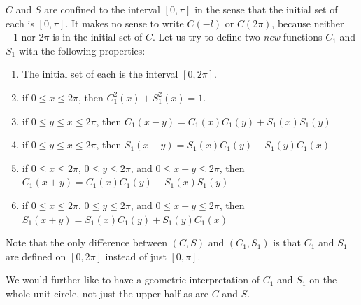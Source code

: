 \documentclass[english]{book}
\begin{document}
$C$ and $S$ are confined to the interval $[0,\pi]$ in the sense that the initial set of each is $[0,\pi]$. It makes no sense to write $C(-l)$ or $C(2\pi)$, because neither $-1$ nor $2\pi$ is in the initial set of $C$. Let us try to define two \emph{new} functions $C_{1}$ and $S_{1}$ with the following properties:
\begin{enumerate}[\hspace{1cm}1)]
  \item The initial set of each is the interval $[0, 2\pi]$.
  \item if $0 \leq x \leq 2\pi$, then $C_{1}^{2}(x) + S_{1}^{2}(x) = 1$.
  \item if $0 \leq y \leq x \leq 2 \pi$, then $C_{1}(x-y) = C_{1}(x) C_{1}(y) + S_{1}(x) S_{1}(y)$
  \item if $0 \leq y \leq x \leq 2 \pi$, then $S_{1}(x-y) = S_{1}(x) C_{1}(y) - S_{1}(y) C_{1}(x)$
  \item if $0 \leq x \leq 2\pi$, $0 \leq y \leq 2\pi$, and $0 \leq x+y \leq 2 \pi$, then $C_{1}(x+y) = C_{1}(x) C_{1}(y) - S_{1}(x) S_{1}(y)$ 
  \item if $0 \leq x \leq 2\pi$, $0 \leq y \leq 2\pi$, and $0 \leq x+y \leq 2 \pi$, then $S_{1}(x+y) = S_{1}(x) C_{1}(y) + S_{1}(y) C_{1}(x)$
\end{enumerate}

Note that the only difference between $(C,S)$ and $(C_{1},S_{1})$ is that $C_{1}$ and $S_{1}$ are defined on $[0,2\pi]$ instead of just $[0,\pi]$.

We would further like to have a geometric interpretation of $C_{1}$ and $S_{1}$ on the whole unit circle, not just the upper half as are $C$ and $S$.
\end{document}
